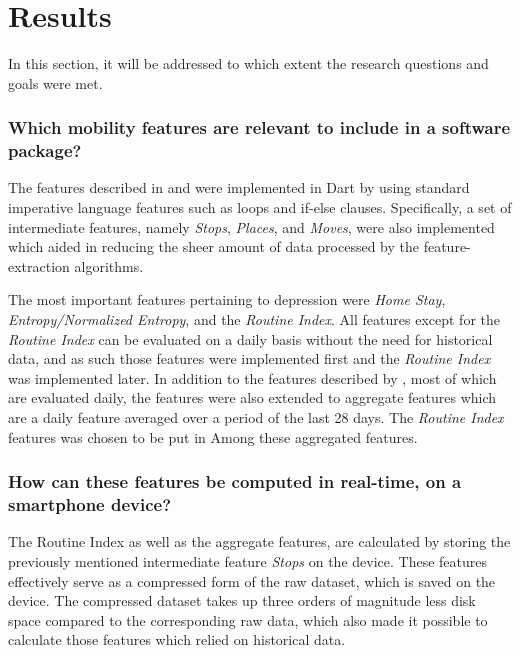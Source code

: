 \section{Results}

In this section, it will be addressed to which extent the research questions and goals were met.

\subsubsection*{Which mobility features are relevant to include in a software package?}
The features described in \cite{Saeb2015} and \cite{extraction-of-behavioural-features} were implemented in Dart by using standard imperative language features such as loops and if-else clauses. Specifically, a set of intermediate features, namely\textit{ Stops}, \textit{Places}, and \textit{Moves}, were also implemented which aided in reducing the sheer amount of data processed by the feature-extraction algorithms.

The most important features pertaining to depression were \textit{Home Stay}, \textit{Entropy/Normalized Entropy}, and the \textit{Routine Index}. All features except for the \textit{Routine Index} can be evaluated on a daily basis without the need for historical data, and as such those features were implemented first and the \textit{Routine Index} was implemented later. In addition to the features described by \cite{Saeb2015}, most of which are evaluated daily, the features were also extended to aggregate features which are a daily feature averaged over a period of the last 28 days. The \textit{Routine Index} features was chosen to be put in Among these aggregated features.

\subsubsection*{How can these features be computed in real-time, on a smartphone device?}
The Routine Index as well as the aggregate features, are calculated by storing the previously mentioned intermediate feature \textit{Stops} on the device. These features effectively serve as a compressed form of the raw dataset, which is saved on the device. The compressed dataset takes up three orders of magnitude less disk space compared to the corresponding raw data, which also made it possible to calculate those features which relied on historical data.

